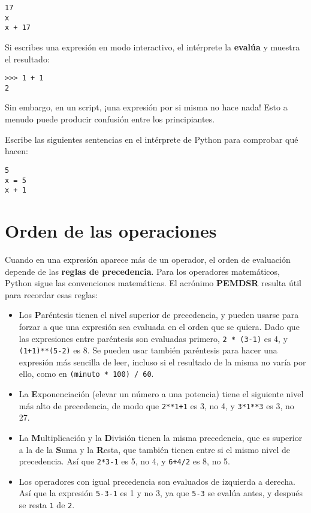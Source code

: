 
\beforeverb
\begin{verbatim}
17
x
x + 17
\end{verbatim}
\afterverb
%
Si escribes una expresión en modo interactivo, el intérprete la
{\bf evalúa} y muestra el resultado:

\beforeverb
\begin{verbatim}
>>> 1 + 1
2
\end{verbatim}
\afterverb
%
Sin embargo, en un script, ¡una expresión por si misma no hace nada!
Esto a menudo puede producir confusión
entre los principiantes.

\begin{ex}
Escribe las siguientes sentencias en el intérprete de Python para comprobar
qué hacen:

\beforeverb
\begin{verbatim}
5
x = 5
x + 1
\end{verbatim}
\afterverb
%
\end{ex}


\section{Orden de las operaciones}

Cuando en una expresión aparece más de un operador, el orden de
evaluación depende de las {\bf reglas de precedencia}. Para los
operadores matemáticos, Python sigue las convenciones matemáticas.
El acrónimo {\bf PEMDSR} resulta útil para
recordar esas reglas:


\begin{itemize}

\item Los {\bf P}aréntesis tienen el nivel superior de precedencia, y pueden usarse
para forzar a que una expresión sea evaluada en el orden que se quiera. Dado
que las expresiones entre paréntesis son evaluadas primero, {\tt 2 * (3-1)} es 4,
y {\tt (1+1)**(5-2)} es 8. Se pueden usar también paréntesis para hacer una
expresión más sencilla de leer, incluso si el resultado de la misma no varía por ello,
como en {\tt (minuto * 100) / 60}.

\item La {\bf E}xponenciación (elevar un número a una potencia) tiene el siguiente nivel más alto de
precedencia, de modo que {\tt 2**1+1} es 3, no 4, y {\tt 3*1**3} es 3, no 27.

\item La {\bf M}ultiplicación y la {\bf D}ivisión tienen la misma precedencia,
que es superior a la de la {\bf S}uma y la {\bf R}esta, que también tienen entre si el mismo
nivel de precedencia. Así que {\tt 2*3-1} es 5, no 4, y
{\tt 6+4/2} es 8, no 5.

\item Los operadores con igual precedencia son evaluados de izquierda a
derecha. Así que la expresión {\tt 5-3-1} es 1 y no 3, ya que
{\tt 5-3} se evalúa antes, y después se resta {\tt 1} de {\tt 2}.

\end{itemize}

